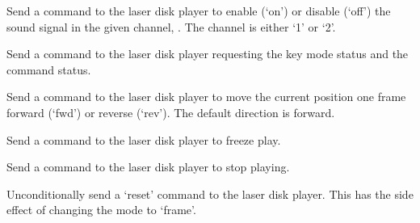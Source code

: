   Send a command to the laser disk player to enable (`on') or disable (`off') the sound signal in
  the given channel, .
  The channel is either `1' or `2'.
  
  Send a command to the laser disk player requesting the key mode status and the command status.
  
  Send a command to the laser disk player to move the current position one frame forward (`fwd') or
  reverse (`rev').
  The default direction is forward.
  
  Send a command to the laser disk player to freeze play.
  
  Send a command to the laser disk player to stop playing.
  
  Unconditionally send a `reset' command to the laser disk player.
  This has the side effect of changing the mode to `frame'.
  
  \objListCmdEnd

\objItemFile

\objItemMessage




%
